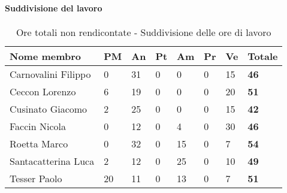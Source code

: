 			\paragraph{Suddivisione del lavoro} %
			\label{par:suddivisione_del_lavoro}
				\begin{table}[!ht]
					\begin{center}
						\begin{tabularx}{0.9\textwidth}{|l|l|l|l|l|l|l|X|}
							\hline
							\textbf{Nome membro} & \textbf{PM} & \textbf{An} & \textbf{Pt} & \textbf{Am} & \textbf{Pr} & \textbf{Ve} & \textbf{Totale} \\
							\hline
							Carnovalini Filippo & 0 & 31 & 0 & 0 & 0 & 15 & \textbf{46} \\
							\hline
							Ceccon Lorenzo & 6 & 19 & 0 & 0 & 0 & 20 & \textbf{51} \\
							\hline
							Cusinato Giacomo & 2 & 25 & 0 & 0 & 0 & 15 & \textbf{42} \\
							\hline
							Faccin Nicola & 0 & 12 & 0 & 4 & 0 & 30 & \textbf{46} \\
							\hline
							Roetta Marco & 0 & 32 & 0 & 15 & 0 & 7 & \textbf{54} \\
							\hline
							Santacatterina Luca & 2 & 12 & 0 & 25 & 0 & 10 & \textbf{49} \\
							\hline
							Tesser Paolo & 20 & 11 & 0 & 13 & 0 & 7 & \textbf{51} \\
							\hline	
						\end{tabularx}
					\end{center}
				\caption{Ore totali non rendicontate - Suddivisione delle ore di lavoro}
				\end{table}
				

